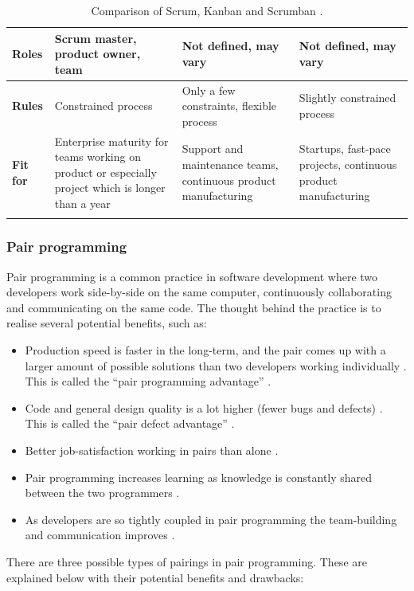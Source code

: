 \begin{center}
\begin{longtable}{| p{2.6cm} | p{3.9cm} | p{3.9cm} | p{3.9cm} |}
    \textbf{Roles} & Scrum master, product owner, team & Not defined, may vary & Not defined, may vary \\ \hline
    \textbf{Rules} & Constrained process & Only a few constraints, flexible process & Slightly constrained process \\ \hline
    \textbf{Fit for} & Enterprise maturity for teams working on product or especially project which is longer than a year & Support and maintenance teams, continuous product manufacturing & Startups, fast-pace projects, continuous product manufacturing \\ \hline 

    \caption{Comparison of Scrum, Kanban and Scrumban \cite{Scrumban2015}.}
    \label{coskas}
    \end{longtable}
\end{center}

\subsubsection{Pair programming}

Pair programming is a common practice in software development where two developers work side-by-side on the same computer, continuously collaborating and communicating on the same code. The thought behind the practice is to realise several potential benefits, such as:

\begin{itemize}
  \item Production speed is faster in the long-term, and the pair comes up with a larger amount of possible solutions than two developers working individually \cite{Cockburn2001}. This is called the ``pair programming advantage'' \cite{Padberg2003}.
  \item Code and general design quality is a lot higher (fewer bugs and defects) \cite{Cockburn2001}. This is called the ``pair defect advantage'' \cite{Padberg2003}.
  \item Better job-satisfaction working in pairs than alone \cite{Cockburn2001}.
  \item Pair programming increases learning as knowledge is constantly shared between the two programmers \cite{Cockburn2001}.
  \item As developers are so tightly coupled in pair programming the team-building and communication improves \cite{Cockburn2001}.
\end{itemize}

There are three possible types of pairings in pair programming. These are explained below with their potential benefits and drawbacks:

